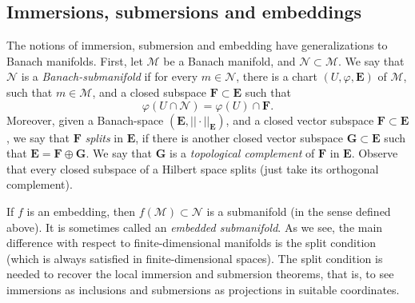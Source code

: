 \subsection{Immersions, submersions and embeddings}
The notions of immersion, submersion and embedding have generalizations to Banach manifolds. First, let \(\mathcal{M}\) be a Banach manifold, and \(\mathcal{N} \subset \mathcal{M}\). We say that \(\mathcal{N}\) is a \textit{Banach-submanifold} if for every \(m \in \mathcal{N}\), there is a chart \((U, \varphi, \mathbf{E})\) of \(\mathcal{M}\), such that \(m \in \mathcal{M}\), and a closed subspace \(\mathbf{F} \subset \mathbf{E}\) such that 
\[
\varphi(U \cap \mathcal{N})=\varphi(U) \cap \mathbf{F}.
\]
Moreover, given a Banach-space \((\mathbf{E}, ||\cdot ||_{\mathbf{E}})\), and a closed vector subspace \(\mathbf{F} \subset \mathbf{E}\), we say that \(\mathbf{F}\) \textit{splits} in \(\mathbf{E}\), if there is another closed vector subspace \(\mathbf{G}\subset \mathbf{E}\) such that \(\mathbf{E}=\mathbf{F}\oplus \mathbf{G}\). We say that \(\mathbf{G}\) is a \textit{topological complement} of \(\mathbf{F}\) in \(\mathbf{E}\). Observe that every closed subspace of a Hilbert space splits (just take its orthogonal complement).

If \(f\) is an embedding, then \(f(\mathcal{M}) \subset \mathcal{N}\) is a submanifold (in the sense defined above). It is sometimes called an \textit{embedded submanifold}. As we see, the main difference with respect to finite-dimensional manifolds is the split condition (which is always satisfied in finite-dimensional spaces). The split condition is needed to recover the local immersion and submersion theorems, that is, to see immersions as inclusions and submersions as projections in suitable coordinates. 

